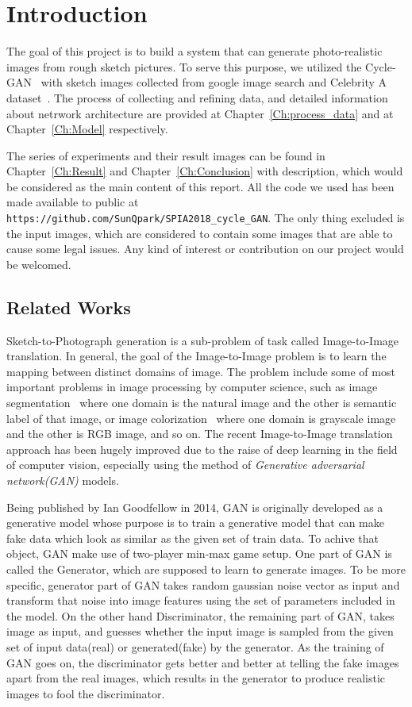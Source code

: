 \chapter{Introduction}\label{Ch:Introduction}

The goal of this project is to build a system that can generate photo-realistic images from rough sketch pictures. To serve this purpose, we utilized the Cycle-GAN~\cite{CycleGAN} with sketch images collected from google image search and Celebrity A dataset~\cite{liu2015faceattributes}. The process of collecting and refining data, and detailed information about netrwork architecture are provided at Chapter~\ref{Ch:process_data} and at Chapter~\ref{Ch:Model} respectively. 

The series of experiments and their result images can be found in Chapter~\ref{Ch:Result} and Chapter~\ref{Ch:Conclusion} with description, which would be considered as the main content of this report. All the code we used has been made available to public at \texttt{https://github.com/SunQpark/SPIA2018\_cycle\_GAN}. The only thing excluded is the input images, which are considered to contain some images that are able to cause some legal issues. Any kind of interest or contribution on our project would be welcomed.

\section{Related Works}

Sketch-to-Photograph generation is a sub-problem of task called Image-to-Image translation. In general, the goal of the Image-to-Image problem is to learn the mapping between distinct domains of image. The problem include some of most important problems in image processing by computer science, such as image segmentation~\cite{FCN} where one domain is the natural image and the other is semantic label of that image, or image colorization~\cite{colorization} where one domain is grayscale image and the other is RGB image, and so on. The recent Image-to-Image translation approach has been hugely improved due to the raise of deep learning in the field of computer vision, especially using the method of \emph{Generative adversarial network(GAN)} models.

Being published by Ian Goodfellow in 2014, GAN is originally developed as a generative model whose purpose is to train a generative model that can make fake data which look as similar as the given set of train data. To achive that object, GAN make use of two-player min-max game setup. One part of GAN is called the Generator, which are supposed to learn to generate images. To be more specific, generator part of GAN takes random gaussian noise vector as input and transform that noise into image features using the set of parameters included in the model. On the other hand Discriminator, the remaining part of GAN, takes image as input, and guesses whether the input image is sampled from the given set of input data(real) or generated(fake) by the generator. As the training of GAN goes on, the discriminator gets better and better at telling the fake images apart from the real images, which results in the generator to produce realistic images to fool the discriminator.

